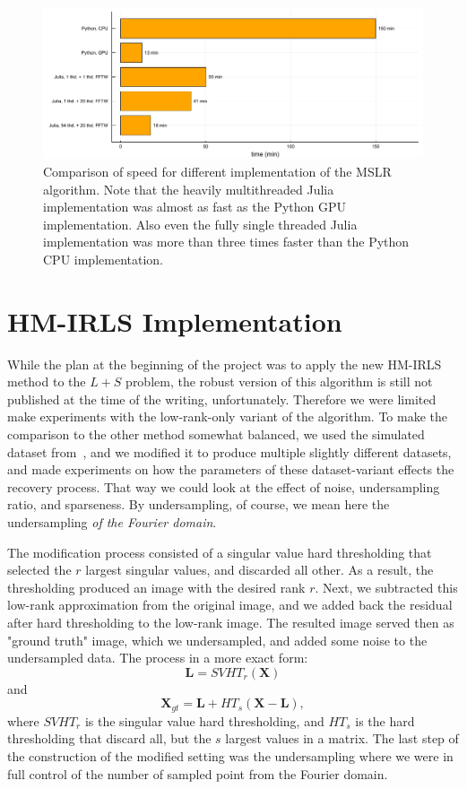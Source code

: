 \begin{figure}
    \centering
    \includegraphics[width=\linewidth]{images/MSLR_recon_speed.pdf}
    \caption{Comparison of speed for different implementation of the MSLR algorithm. Note that the heavily multithreaded Julia implementation was almost as fast as the Python GPU implementation. Also even the fully single threaded Julia implementation was more than three times faster than the Python CPU implementation.}
    \label{fig:MSLR_recon_speed}
\end{figure}


\section{HM-IRLS Implementation}

While the plan at the beginning of the project was to apply the new HM-IRLS method to the $L+S$ problem, the robust version of this algorithm is still not published at the time of the writing, unfortunately. Therefore we were limited make experiments with the low-rank-only variant of the algorithm. To make the comparison to the other method somewhat balanced, we used the simulated dataset from~\cite{wissmann_mrxcat_2014}, and we modified it to produce multiple slightly different datasets, and made experiments on how the parameters of these dataset-variant effects the recovery process. That way we could look at the effect of noise, undersampling ratio, and sparseness. By undersampling, of course, we mean here the undersampling \textit{of the Fourier domain}.

The modification process consisted of a singular value hard thresholding that selected the $r$ largest singular values, and discarded all other. As a result, the thresholding produced an image with the desired rank $r$. Next, we subtracted this low-rank approximation from the original image, and we added back the residual after hard thresholding to the low-rank image. The resulted image served then as "ground truth" image, which we undersampled, and added some noise to the undersampled data. The process in a more exact form:
\[\mathbf{L} = SVHT_r(\mathbf{X})\]
and
\[\mathbf{X}_{gt} = \mathbf{L} + HT_s(\mathbf{X} - \mathbf{L}),\]
where $SVHT_r$ is the singular value hard thresholding,
and $HT_s$ is the hard thresholding that discard all, but the $s$ largest values in a matrix. The last step of the construction of the modified setting was the undersampling where we were in full control of the number of sampled point from the Fourier domain.

